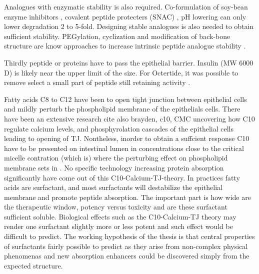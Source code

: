 Analogues with enzymatic stability is also required. Co-formulation of soy-bean enzyme inhibitors \cite{fujii1985promoting}, covalent peptide protecters (SNAC) \cite{bruno2013basics}, pH lowering \cite{welling2014citric} can only lower degradation 2 to 5-fold. Designing stable analogues is also needed to obtain sufficient stability. PEGylation, cyclization and modification of back-bone structure are know approaches to increase intrinsic peptide analogue stability \cite{bruno2013basics}.

Thirdly peptide or proteins have to pass the epithelial barrier. Insulin (MW 6000 D) is likely near the upper limit of the size. For Octertide, it was possible to remove select a small part of peptide still retaining activity \cite{aguiree2013idf}. 

Fatty acids C8 to C12 have been to open tight junction between epithelial cells and mildly perturb the phospholipid membrane of the epithelials cells. There have been an extensive research {cite also brayden, c10, CMC} \cite{bruno2013basics} uncovering how C10 regulate calcium levels, and phosphyrolation cascades of the epithelial cells leading to opening of TJ. Nontheless, inorder to obtain a suffcient response C10 have to be presented on intestinal lumen in concentrations close to the critical micelle contration (which is) where the perturbing effect on phospholipid membrane sets in \cite{bruno2013basics}. No specific technology increasing protein absorption significantly have come out of this C10-Calcium-TJ-theory. In practices fatty acids are surfactant, and most surfactants will destabilize the epithelial membrane and promote peptide absorption. The important part is how wide are the therapeutic window, potency versus toxicity and are these surfactant sufficient soluble. Biological effects such as the C10-Calcium-TJ theory may render one surfactant slightly more or less potent and such effect would be difficult to predict. The working hypothesis of the thesis is that central properties of surfactants fairly possible to predict as they arise from non-complex physical phenomenas and new absorption enhancers could be discovered simply from the expected structure.

